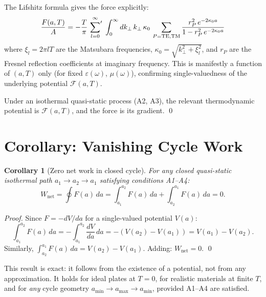 \documentclass[11pt]{article}
\newtheorem{corollary}{Corollary}
\begin{document}
The Lifshitz formula gives the force explicitly:
\begin{equation}
  \frac{F(a,T)}{A} = -\frac{T}{\pi}\,
  \sideset{}{'}\sum_{l=0}^{\infty}\;
  \int_0^\infty dk_\perp\, k_\perp\, \kappa_0 \,
  \sum_{P=\mathrm{TE,TM}}
  \frac{r_P^2\, e^{-2\kappa_0 a}}{1 - r_P^2\, e^{-2\kappa_0 a}}
  \label{eq:lifshitz-force}
\end{equation}
where $\xi_l = 2\pi l T$ are the Matsubara frequencies,
$\kappa_0 = \sqrt{k_\perp^2 + \xi_l^2}$, and $r_P$ are the
Fresnel reflection coefficients at imaginary frequency.
This is manifestly a function of $(a, T)$ only (for fixed
$\varepsilon(\omega)$, $\mu(\omega)$), confirming single-valuedness of
the underlying potential $\mathcal{F}(a,T)$.

Under an isothermal quasi-static process (A2, A3), the relevant
thermodynamic potential is $\mathcal{F}(a,T)$, and the force is its
gradient. \qed

\section{Corollary: Vanishing Cycle Work}

\begin{corollary}[Zero net work in closed cycle]
\label{cor:vanishing-work}
For any closed quasi-static isothermal path $a_1 \to a_2 \to a_1$
satisfying conditions A1--A4:
\begin{equation}
  W_\mathrm{net} = \oint F(a)\, da
  = \int_{a_1}^{a_2} F(a)\, da + \int_{a_2}^{a_1} F(a)\, da = 0.
  \label{eq:wnet-zero}
\end{equation}
\end{corollary}

\begin{proof}
Since $F = -dV/da$ for a single-valued potential $V(a)$:
\[
  \int_{a_1}^{a_2} F(a)\,da
  = -\int_{a_1}^{a_2} \frac{dV}{da}\, da
  = -(V(a_2) - V(a_1))
  = V(a_1) - V(a_2).
\]
Similarly, $\int_{a_2}^{a_1} F(a)\, da = V(a_2) - V(a_1)$.
Adding: $W_\mathrm{net} = 0$. \qed
\end{proof}

This result is exact: it follows from the existence of a potential,
not from any approximation. It holds for ideal plates at $T=0$,
for realistic materials at finite $T$, and for \emph{any} cycle
geometry $a_\mathrm{min} \to a_\mathrm{max} \to a_\mathrm{min}$,
provided A1--A4 are satisfied.
\end{document}
